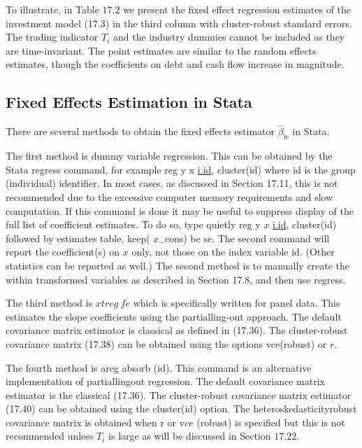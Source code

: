 \documentclass[10pt]{article}
\begin{document}
To illustrate, in Table $17.2$ we present the fixed effect regression estimates of the investment model (17.3) in the third column with cluster-robust standard errors. The trading indicator $T_{i}$ and the industry dummies cannot be included as they are time-invariant. The point estimates are similar to the random effects estimates, though the coefficients on debt and cash flow increase in magnitude.

\subsection{Fixed Effects Estimation in Stata}
There are several methods to obtain the fixed effects estimator $\widehat{\beta}_{\mathrm{fe}}$ in Stata.

The first method is dummy variable regression. This can be obtained by the Stata regress command, for example reg y $\mathrm{x}$ \href{http://i.id}{i.id}, cluster(id) where id is the group (individual) identifier. In most cases, as discussed in Section 17.11, this is not recommended due to the excessive computer memory requirements and slow computation. If this command is done it may be useful to suppress display of the full list of coefficient estimates. To do so, type quietly reg y $x$ \href{http://i.id}{i.id}, cluster(id) followed by estimates table, keep( $x_{-}$cons) be se. The second command will report the coefficient(s) on $x$ only, not those on the index variable id. (Other statistics can be reported as well.) The second method is to manually create the within transformed variables as described in Section 17.8, and then use regress.

The third method is $x t r e g ~ f e$ which is specifically written for panel data. This estimates the slope coefficients using the partialling-out approach. The default covariance matrix estimator is classical as defined in (17.36). The cluster-robust covariance matrix (17.38) can be obtained using the options vce(robust) or $r$.

The fourth method is areg absorb (id). This command is an alternative implementation of partiallingout regression. The default covariance matrix estimator is the classical (17.36). The cluster-robust covariance matrix estimator (17.40) can be obtained using the cluster(id) option. The heteroskedasticityrobust covariance matrix is obtained when $\mathrm{r}$ or $\mathrm{v} c e$ (robust) is specified but this is not recommended unless $T_{i}$ is large as will be discussed in Section $17.22$.
\end{document}
